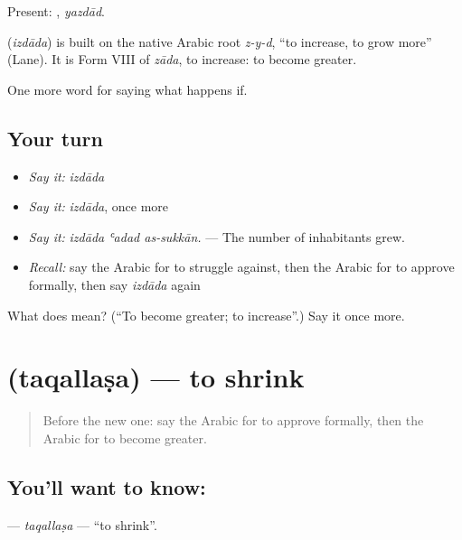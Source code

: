 Present: , \emph{yazdād}.

\begin{cousinweb}
\textbf{} (\emph{izdāda}) is built on the native Arabic root \emph{z-y-d}, \textquotedblleft{}to increase, to grow more\textquotedblright{} (Lane). It is Form VIII of \emph{zāda}, to increase: to become greater.
\end{cousinweb}

\begin{grammarlens}[title={What you've built}]
One more word for saying what happens if.
\end{grammarlens}

\subsection*{Your turn}
\begin{itemize}
\raggedright
  \item \emph{Say it:} \emph{izdāda}
  \item \emph{Say it:} \emph{izdāda}, once more
  \item \emph{Say it:} \emph{izdāda ʿadad as-sukkān.} — The number of inhabitants grew.
  \item \emph{Recall:} say the Arabic for to struggle against, then the Arabic for to approve formally, then say \emph{izdāda} again
\end{itemize}

\begin{tcolorbox}[breakable,colback=teal!4,colframe=teal!35!black,title={Before you move on}]
What does  mean? (\textquotedblleft{}To become greater; to increase\textquotedblright{}.) Say it once more.
\end{tcolorbox}
\section[\texorpdfstring{\ar{تقلص} (taqallaṣa)}{تقلص (taqallaṣa)}]{ (taqallaṣa) — to shrink}

\label{lesson:AR-C412-taqallasa}



\begin{quote}
Before the new one: say the Arabic for to approve formally, then the Arabic for to become greater.
\end{quote}

\subsection*{You'll want to know: }
\textbf{} — \emph{taqallaṣa} — \textquotedblleft{}to shrink\textquotedblright{}.


